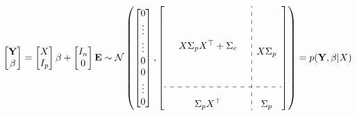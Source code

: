 \begin{gather}
    \begin{bmatrix}
        \mathbf{Y} \\
        \beta
    \end{bmatrix}
    = \begin{bmatrix} X \\ I_p \end{bmatrix} \beta + \begin{bmatrix} I_n \\ 0 \end{bmatrix}  \mathbf{E}
    \sim \N \left(
        \begin{bmatrix}
        0 \\
        \vdots \\
        \vdots \\
        0 \\
        0 \\
        \vdots \\
        0
        \end{bmatrix},
        \left[
        \begin{array}{ c:c c c }
            \begin{matrix}
                & & \\
                & & \\
                & & \\
                & X \Sigma_p X^{\top} + \Sigma_e & \\
                & & \\
                & & \\
                & & \\
            \end{matrix}
            & \begin{matrix} \\ \\ \\ X \Sigma_p  \\ \\ \\ \end{matrix} \\
            \hdashline \\
            \begin{matrix} &  \Sigma_p X^{\top} & \end{matrix} & \Sigma_p
        \end{array}
        \right]
        \right)
    = p(\mathbf{Y}, \beta | X)
\end{gather}


